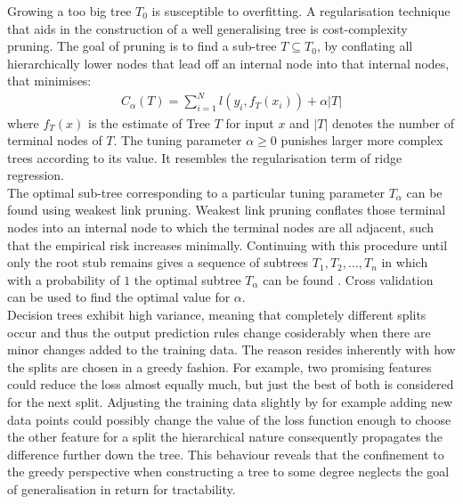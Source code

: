 \documentclass[a4paper, 11pt]{article}
\begin{document}
Growing a too big tree $T_0$ is susceptible to overfitting. A regularisation technique that aids in the construction of a well generalising tree is cost-complexity pruning. The goal of pruning is to find a sub-tree $T \subseteq T_0$, by conflating all hierarchically lower nodes that lead off an internal node into that internal nodes, that minimises:
\begin{align*}
C_\alpha(T) = \sum_{i = 1}^{N} l(y_i, f_T(x_i)) + \alpha |T|
\end{align*}
where $f_T(x)$ is the estimate of Tree $T$ for input $x$ and $|T|$ denotes the number of terminal nodes of $T$. The tuning parameter $\alpha \geq 0$ punishes larger more complex trees according to its value. It resembles the regularisation term of ridge regression. \\
The optimal sub-tree corresponding to a particular tuning parameter $T_{\alpha}$ can be found using weakest link pruning. Weakest link pruning conflates those terminal nodes into an internal node to which the terminal nodes are all adjacent, such that the empirical risk increases minimally. Continuing with this procedure until only the root stub remains gives a sequence of subtrees $T_1, T_2, \ldots, T_n$ in which with a probability of $1$ the optimal subtree $T_{\alpha}$ can be found \cite{breiman1984classification}. Cross validation can be used to find the optimal value for $\alpha$.\\

Decision trees exhibit high variance, meaning that completely different splits occur and thus the output prediction rules change cosiderably when there are minor changes added to the training data. The reason resides inherently with how the splits are chosen in a greedy fashion. For example, two promising features could reduce the loss almost equally much, but just the best of both is considered for the next split. Adjusting the training data slightly by for example adding new data points could possibly change the value of the loss function enough to choose the other feature for a split the hierarchical nature consequently propagates the difference further down the tree. This behaviour reveals that the confinement to the greedy perspective when constructing a tree to some degree neglects the goal of generalisation in return for tractability.\\ %
\end{document}
